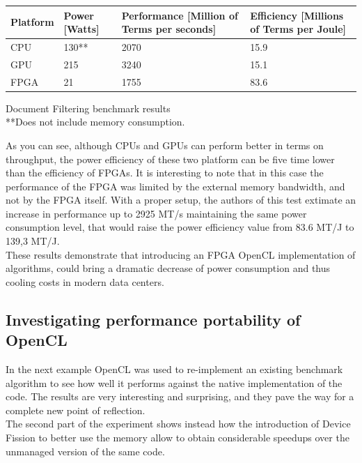 \begin{tablehere}
{\footnotesize
\begin{tabular}{|p{}|p{}|p{}|p{}|}\hline
\textbf{Platform} & \textbf{Power} [Watts] & \textbf{Performance} [Million of Terms per seconds] & \textbf{Efficiency} [Millions of Terms per Joule]\\ \hline
CPU & 130** & 2070 & 15.9 \\ \hline
GPU & 215 & 3240 & 15.1 \\ \hline
FPGA & 21 & 1755 & 83.6 \\ \hline
\end{tabular}}
  \caption{Document Filtering benchmark results\\ **Does not include memory consumption.\\}
	\label{tab:FPGABenchmark2}
\end{tablehere}

As you can see, although CPUs and GPUs can perform better in terms on throughput, the power efficiency of these two platform can be five time lower than the efficiency of FPGAs. It is interesting to note that in this case the performance of the FPGA was limited by the external memory bandwidth, and not by the FPGA itself. With a proper setup, the authors of this test extimate an increase in performance up to 2925 MT/s maintaining the same power consumption level, that would raise the power efficiency value from 83.6 MT/J to 139,3 MT/J.\\
These results demonstrate that introducing an FPGA OpenCL implementation of algorithms, could bring a dramatic decrease of power consumption and thus cooling costs in modern data centers.



\subsection{Investigating performance portability of OpenCL}

In the next example \cite{Pennycook2012} OpenCL was used to re-implement an existing benchmark algorithm to see how well it performs against the native implementation of the code. The results are very interesting and surprising, and they pave the way for a complete new point of reflection.\\
The second part of the experiment shows instead how the introduction of Device Fission to better use the memory allow to obtain considerable speedups over the unmanaged version of the same code.

